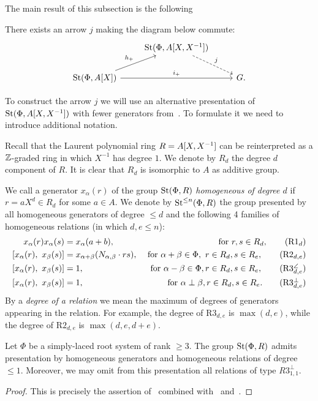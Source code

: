 The main result of this subsection is the following
\begin{prop}
    There exists an arrow $j$ making the diagram below commute:
    \[\begin{tikzcd}           & \St(\Phi, A[X, X\inv]) \arrow[rd, dashrightarrow, "j"] & \\
           \St(\Phi, A[X]) \arrow{ru}{h_+} \arrow{rr}{i_+} &                                & G.
    \end{tikzcd}\]
\end{prop}

To construct the arrow $j$ we will use an alternative presentation of $\operatorname{St}(\Phi, A[X, X^{-1}])$ with fewer generators from~\cite{LS20}.
To formulate it we need to introduce additional notation.

Recall that the Laurent polynomial ring $R = A[X, X^{-1}]$ can be reinterpreted as a $\mathbb{Z}$-graded ring in which $X^{-1}$ has degree $1$.
We denote by $R_d$ the degree $d$ component of $R$.
It is clear that $R_d$ is isomorphic to $A$ as additive group.

We call a generator $x_\alpha(r)$ of the group $\operatorname{St}(\Phi, R)$ \textit{homogeneous of degree $d$} if $r = aX^d \in R_d$ for some $a\in A$.
We denote by $\operatorname{St}^{\leq n}(\Phi, R)$ the group presented by all homogeneous generators of degree $\leq d$ and the following 4 families of homogeneous relations (in which $d, e \leq n$):
\begin{align}
    x_{\alpha}(r) x_{\alpha}(s)    &= x_{\alpha}(a + b), & \text{ for } r, s \in R_d, \tag{R$1_d$} \\
    [x_{\alpha}(r),\ x_{\beta}(s)] &= x_{\alpha + \beta}(N_{\alpha, \beta} \cdot rs), &\text{ for } \alpha + \beta \in \Phi,\ r \in R_d, s \in R_e, \tag{R$2_{d, e}$} \\
    [x_{\alpha}(r),\ x_{\beta}(s)] &= 1, &\text{ for }\alpha - \beta \in \Phi, r \in R_d, s \in R_e, \tag{R$3_{d, e}^\angle$} \\
    [x_{\alpha}(r),\ x_{\beta}(s)] &= 1, &\text{ for }\alpha \perp \beta, r \in R_d, s \in R_e. \tag{R$3_{d,e}^\perp$}
\end{align}
By a \textit{degree of a relation} we mean the maximum of degrees of generators appearing in the relation.
For example, the degree of R$3_{d, e}$ is $\max(d, e)$, while the degree of R$2_{d, e}$ is $\max(d, e, d+e).$

\begin{lemma} \label{lem:homog-presentation}
    Let $\Phi$ be a simply-laced root system of rank $\geq 3$. %
    The group $\operatorname{St}(\Phi, R)$ admits presentation by homogeneous generators and homogeneous relations of degree $\leq 1$.
    Moreover, we may omit from this presentation all relations of type $R3^\perp_{1, 1}$.
\end{lemma}
\begin{proof}
    This is precisely the assertion of~\cite[Proposition~5.3]{LS20} combined with~\cite[Lemma~5.2]{LS20} and~\cite[Remark~5.5]{LS20}.
\end{proof}

